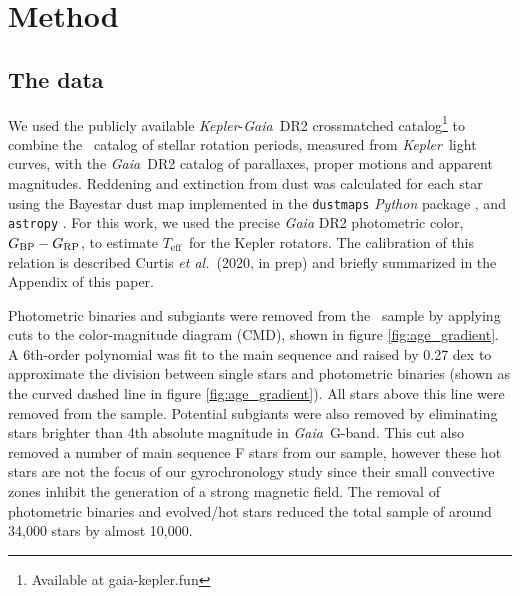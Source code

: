 \documentclass{aastex63}
\newcommand{\etal}{{\it et al.}}
\newcommand{\kepler}{{\it Kepler}}
\newcommand{\gaia}{{\it Gaia}}
\newcommand{\teff}{$T_{\mathrm{eff}}$}
\newcommand{\mct}{\citet{mcquillan2014}}
\newcommand{\racomment}[1]{{\color{blue}#1}}
\begin{document}
\section{Method}
\label{sec:method}

\subsection{The data}
\label{sec:the_data}

We used the publicly available \kepler-\gaia\ DR2 crossmatched
catalog\footnote{Available at gaia-kepler.fun} to combine the \mct\ catalog of
stellar rotation periods, measured from \kepler\ light curves, with the \gaia\
DR2 catalog of parallaxes, proper motions and apparent magnitudes.
Reddening and extinction from dust was calculated for each star using the
Bayestar dust map implemented in the {\tt dustmaps} {\it Python} package
\citep{green2018}, and {\tt astropy} \citep{astropy2013, astropy2018}.
For this work, we used the precise \textit{Gaia} DR2 photometric color,
$G_{\rm BP} - G_{\rm RP}$, to estimate \teff\ for the Kepler rotators.
\racomment{The calibration of this relation is described Curtis \etal\ (2020,
in prep) and briefly summarized in the Appendix of this paper.}

Photometric binaries and subgiants were removed from the \mct\ sample by
applying cuts to the color-magnitude diagram (CMD), shown in figure
\ref{fig:age_gradient}.
A 6th-order polynomial was fit to the main sequence and raised by 0.27 dex to
approximate the division between single stars and photometric binaries (shown
as the curved dashed line in figure \ref{fig:age_gradient}).
All stars above this line were removed from the sample.
Potential subgiants were also removed by eliminating stars brighter than 4th
absolute magnitude in \gaia\ G-band.
This cut also removed a number of main sequence F stars from our sample,
however these hot stars are not the focus of our gyrochronology study since
their small convective zones inhibit the generation of a strong magnetic
field.
The removal of photometric binaries and evolved/hot stars reduced the total
sample of around 34,000 stars by almost 10,000.
\end{document}
